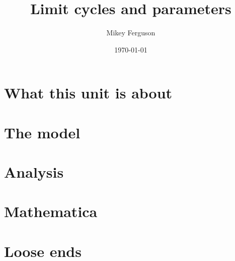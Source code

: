 \documentclass[11pt]{article}
\title{Limit cycles and parameters}
\author{Mikey Ferguson}
\date{\today}
\begin{document}
\maketitle
\tableofcontents
\bigskip

\section{What this unit is about}

\section{The model}

\section{Analysis}

\section{Mathematica}

\section{Loose ends}
\end{document}
